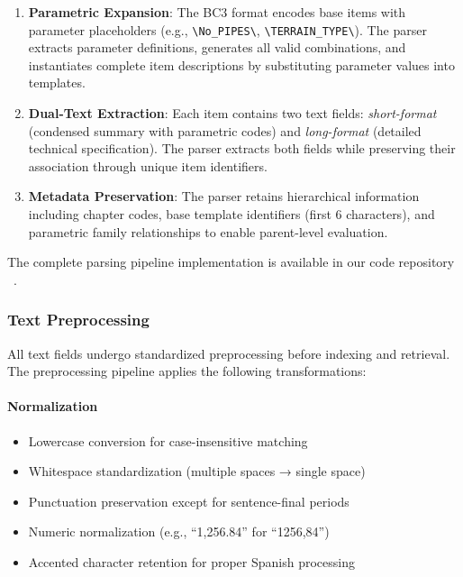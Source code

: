 \documentclass[preprint,review,12pt]{elsarticle}
\begin{document}
\begin{enumerate}
    \item \textbf{Parametric Expansion}: The BC3 format encodes base items with parameter placeholders (e.g., \texttt{\textbackslash No\_PIPES\textbackslash}, \texttt{\textbackslash TERRAIN\_TYPE\textbackslash}). The parser extracts parameter definitions, generates all valid combinations, and instantiates complete item descriptions by substituting parameter values into templates.
    
    \item \textbf{Dual-Text Extraction}: Each item contains two text fields: \textit{short-format} (condensed summary with parametric codes) and \textit{long-format} (detailed technical specification). The parser extracts both fields while preserving their association through unique item identifiers.
    
    \item \textbf{Metadata Preservation}: The parser retains hierarchical information including chapter codes, base template identifiers (first 6 characters), and parametric family relationships to enable parent-level evaluation.
\end{enumerate}

The complete parsing pipeline implementation is available in our code repository ~\cite{bc3cat_software}.

\subsubsection{Text Preprocessing}

All text fields undergo standardized preprocessing before indexing and retrieval. The preprocessing pipeline applies the following transformations:

\paragraph{Normalization}
\begin{itemize}
    \item Lowercase conversion for case-insensitive matching
    \item Whitespace standardization (multiple spaces → single space)
    \item Punctuation preservation except for sentence-final periods
    \item Numeric normalization (e.g., ``1,256.84'' for ``1256,84'')
    \item Accented character retention for proper Spanish processing
\end{itemize}
\end{document}
